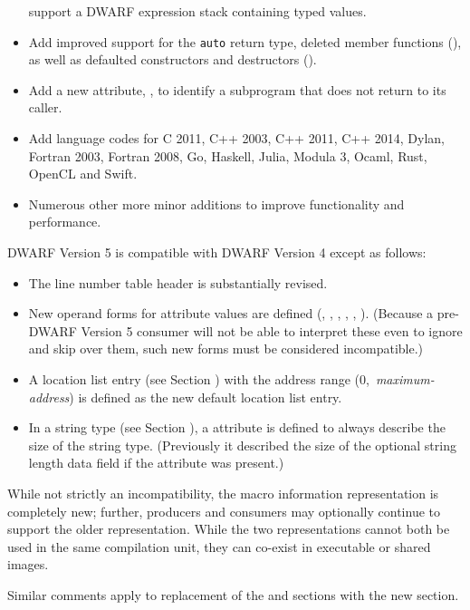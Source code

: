 \begin{itemize}
support a DWARF expression stack containing typed values.
\item Add improved support for the  \texttt{auto}
return type, deleted member functions (\DWATdeletedNAME), as well as defaulted 
constructors and destructors (\DWATdefaultedNAME).
\item Add a new attribute, \DWATnoreturnNAME{}, to identify 
a subprogram that does not return to its caller.
\item Add language codes for C 2011, C++ 2003, C++ 2011, C++ 2014,
Dylan, Fortran 2003, Fortran 2008, Go, Haskell, 
Julia, Modula 3, Ocaml, Rust, OpenCL and Swift.
\item Numerous other more minor additions to improve functionality
and performance.
\end{itemize}

DWARF Version 5 is compatible with DWARF Version 4 except as follows:
\begin{itemize}
\item The line number table header is substantially revised.
\item New operand forms for attribute values are defined 
(\DWFORMaddrxNAME, \DWFORMdatasixteenNAME, \DWFORMlinestrpNAME, 
\DWFORMrefsupNAME, \DWFORMstrpsupNAME, \DWFORMstrxNAME).
(Because a pre-DWARF Version 5 consumer will not be able to interpret 
these even to ignore and skip over them, such new forms must be 
considered incompatible.)
\item A location list entry (see Section ) 
with the address range \mbox{(0, \textit{maximum-address})} is defined 
as the new default location list entry.
\item In a string type (see Section ), 
a \DWATbytesizeNAME{} attribute is defined to always describe the size 
of the string type. (Previously
it described the size of the optional string length data field if the 
\DWATstringlengthNAME{} attribute was present.)
\end{itemize}

While not strictly an incompatibility, the macro information 
representation is completely new; further, producers 
and consumers may optionally continue to support the older 
representation. While the two representations cannot both be 
used in the same compilation unit, they can co-exist in 
executable or shared images.

Similar comments apply to replacement of the \dotdebugpubnames{} 
and \dotdebugpubtypes{} sections with the new \dotdebugnames{} 
section.

